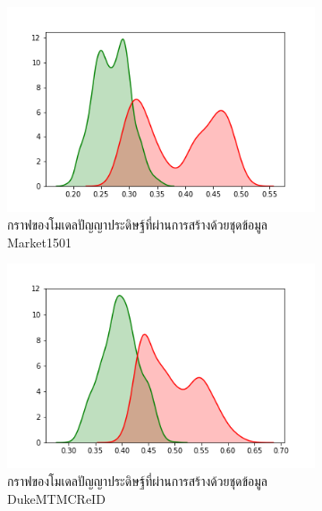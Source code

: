 \begin{figure}[!ht]
    \centering
    \begin{subfigure}[b]{0.4\textwidth}
        \centering
        \includegraphics[width=\textwidth]{chapter4/images/graph_market.png}
	\caption{กราฟของโมเดลปัญญาประดิษฐ์ที่ผ่านการสร้างด้วยชุดข้อมูล Market1501}
        \label{fig:graph_market}
    \end{subfigure}
    \hfill
    \begin{subfigure}[b]{0.4\textwidth}
        \centering
        \includegraphics[width=\textwidth]{chapter4/images/graph_dukemtmc.png}
	\caption{กราฟของโมเดลปัญญาประดิษฐ์ที่ผ่านการสร้างด้วยชุดข้อมูล DukeMTMCReID}
        \label{fig:graph_dukemtmc}
    \end{subfigure}
    \hfill
    \begin{subfigure}[b]{0.4\textwidth}
        \centering

\end{subfigure}
\end{figure}
